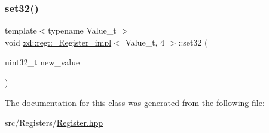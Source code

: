 \subsubsection{\texorpdfstring{set32()}{set32()}}
{\footnotesize\ttfamily template$<$typename Value\+\_\+t $>$ \\
void \mbox{\hyperlink{classxd_1_1reg_1_1___register__impl}{xd\+::reg\+::\+\_\+\+Register\+\_\+impl}}$<$ Value\+\_\+t, 4 $>$\+::set32 (\begin{DoxyParamCaption}\item[{uint32\+\_\+t}]{new\+\_\+value }\end{DoxyParamCaption})\hspace{0.3cm}{\ttfamily [inline]}}



The documentation for this class was generated from the following file\+:\begin{DoxyCompactItemize}
\item 
src/\+Registers/\mbox{\hyperlink{_register_8hpp}{Register.\+hpp}}\end{DoxyCompactItemize}
